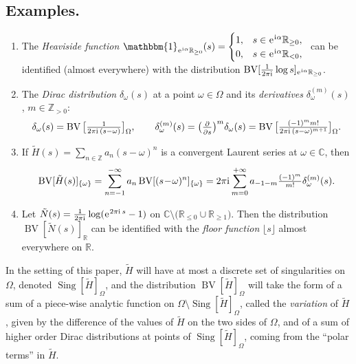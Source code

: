 \documentclass[a4paper,11pt]{amsart}
\numberwithin{equation}{section}
\newcommand{\C}{{\mathbb C}}
\newcommand{\Z}{{\mathbb Z}}
\newcommand{\R}{{\mathbb R}}
\newcommand{\sminus}{\setminus} %
\renewcommand{\i}{\mathrm{i}\mkern.25\thinmuskip}
\newcommand{\e}{\ensuremath{\mkern.25\thinmuskip\mathrm{e}\mkern.4\thinmuskip}}
\newcommand{\tdd}[1]{\tfrac{\partial}{\partial #1 \vphantom{\hat X}}}
\newcommand{\BV}{\operatorname{BV}}
\newcommand{\Sing}{\operatorname{Sing}}
\newcommand{\pls}{{\scalebox{0.7}{$\pmb{+}$}}}
\theoremstyle{definition}
\def\sideremark#1{\ifvmode\leavevmode\fi\vadjust{\vbox to0pt{\vss %
			\hbox to 0pt{\hskip\hsize\hskip1em           %
				\vbox{\hsize3.5cm\tiny\raggedright\pretolerance10000%
					\noindent #1\hfill}\hss}\vbox to8pt{\vfil}\vss}}}%
\newcommand{\edz}[1]{\sideremark{#1}}
\newcommand{\Blue}[1]{{\color{blue}#1}}
\newcommand{\Red}[1]{{\color{red}#1}}
\begin{document}
\subsection*{Examples.}
\begin{enumerate}[wide=0pt, leftmargin=\parindent]
	\item The \emph{Heaviside function} $\mathbbm{1}_{\e^{\i\alpha}\R_{\geq 0}}(s)	=\begin{cases} 1, & s\in \e^{\i\alpha}\R_{\geq 0},\\ 0,& s\in \e^{\i\alpha}\R_{<0},\end{cases}\ $ %
	can be identified (almost everywhere) with the distribution 
	$\BV[\tfrac{1}{2\pi\i }\log s]_{\e^{\i\alpha}\R_{\geq 0}}$.
	\item The \emph{Dirac distribution} $\delta_\omega(s)$ at a point $\omega\in\Omega$ and its \emph{derivatives} $\delta_\omega^{(m)}(s)$, $m\in\Z_{>0}$:
	\[\delta_\omega(s)=\BV\big[\tfrac{1}{2\pi\i \,(s-\omega)}\big]_\Omega,\qquad 
	\delta_\omega^{(m)}(s)=\big(\tdd{s}\big)^m\delta_\omega(s)=\BV\big[\tfrac{(-1)^{m}m!}{2\pi\i \,(s-\omega)^{m+1}}\big]_\Omega.\]
	\item If $\tilde H(s)=\sum_{n\in\Z}a_n(s\!-\!\omega)^n$ is a convergent Laurent series at $\omega\in\C$, then 
	\[\BV[\tilde H(s)]_{\{\omega\}}=\sum_{n=-1}^{-\infty}a_{n}\BV[(s\!-\!\omega)^{n}]_{\{\omega\}}=2\pi\i \sum_{m=0}^{+\infty}a_{-1-m}\tfrac{(-1)^m}{m!}\delta_\omega^{(m)}(s).\]
	\item Let $\tilde N(s)=\tfrac{1}{2\pi\i}\log(\e^{2\pi\i\,s}-1)$ on $\C\sminus\big(\R_{\leq 0}\cup\R_{\geq 1}\big)$. Then the distribution $\BV[\tilde N(s)]_\R$ can be identified with the \emph{floor function} $\lfloor s\rfloor$ almost everywhere on $\R$.
\end{enumerate}


In the setting of this paper, $\tilde H$ will have at most a discrete set of singularities on $\Omega$, denoted $\Sing[\tilde H]_\Omega$, 
and the distribution $\BV[\tilde H]_\Omega$ will take the form of a sum of a piece-wise analytic function
on $\Omega\sminus\Sing[\tilde H]_\Omega$, 
called the \emph{variation} of $\tilde H$, given by the difference of the values of $\tilde H$ on the two sides of $\Omega$,
and of a sum of higher order Dirac distributions at points of $\Sing[\tilde H]_\Omega$, coming from the ``polar terms'' in $\tilde H$.
\end{document}
